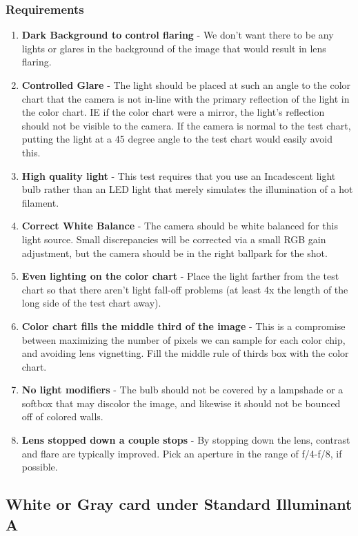 \documentclass[twoside]{article}
\begin{document}
\subsubsection{Requirements}
\begin{enumerate}
    \item \textbf{Dark Background to control flaring} - We don't want there to be any lights or glares in the background of the image that would result in lens flaring.
    \item \textbf{Controlled Glare} - The light should be placed at such an angle to the color chart that the camera is not in-line with the primary reflection of the light in the color chart. IE if the color chart were a mirror, the light's reflection should not be visible to the camera. If the camera is normal to the test chart, putting the light at a 45 degree angle to the test chart would easily avoid this.
    \item \textbf{High quality light} - This test requires that you use an Incadescent light bulb rather than an LED light that merely simulates the illumination of a hot filament.
    \item \textbf{Correct White Balance} - The camera should be white balanced for this light source. Small discrepancies will be corrected via a small RGB gain adjustment, but the camera should be in the right ballpark for the shot.
    \item \textbf{Even lighting on the color chart} - Place the light farther from the test chart so that there aren't light fall-off problems (at least 4x the length of the long side of the test chart away).
    \item \textbf{Color chart fills the middle third of the image} - This is a compromise between maximizing the number of pixels we can sample for each color chip, and avoiding lens vignetting. Fill the middle rule of thirds box with the color chart.
    \item \textbf{No light modifiers} - The bulb should not be covered by a lampshade or a softbox that may discolor the image, and likewise it should not be bounced off of colored walls.
    \item \textbf{Lens stopped down a couple stops} - By stopping down the lens, contrast and flare are typically improved. Pick an aperture in the range of f/4-f/8, if possible.
\end{enumerate}

\subsection{White or Gray card under Standard Illuminant A}
\end{document}
